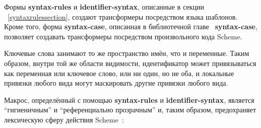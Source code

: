 Формы {\cf\bfseries syntax-rules} и {\cf\bfseries identifier-syntax}, описанные в секции
~\ref{syntaxrulessection}, создают трансформеры посредством языка шаблонов. Кроме того, форма
{\cf\bfseries syntax-case}, описанная в библиотечной главе~
{{\cf\bfseries syntax-case}}, позволяет создавать трансформеры посредством произвольного кода
Scheme.\vspace{1mm}

Ключевые слова занимают то же пространство имён, что и переменные. Таким образом,
внутри той же области видимости, идентификатор может привязываться как переменная или
ключевое слово, или ни один, но не оба, и локальные привязки любого вида могут маскировать другие
привязки любого вида.\vspace{1mm}

Макрос, определённый с помощью {\cf\bfseries syntax-rules} и {\cf\bfseries
  identifier-\hp{}syntax}, является ``гигиеничным'' и ``референциально прозрачным'' и, таким
образом, предохраняет лексическую сферу действия
Scheme~\cite{Kohlbecker86,hygienic,Bawden88,macrosthatwork,syntacticabstraction}:


